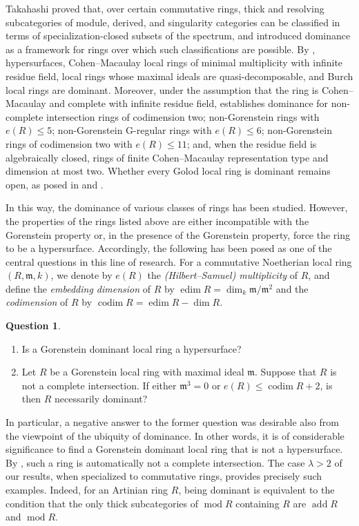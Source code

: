 \documentclass{amsart}
\theoremstyle{definition}
\newtheorem{ques}[thm]{Question}
\theoremstyle{remark}
\numberwithin{equation}{thm}
\def\add{\operatorname{add}}
\def\codim{\operatorname{codim}}
\def\dim{\operatorname{dim}}
\def\edim{\operatorname{edim}}
\def\le{\leqslant}
\def\m{\mathfrak{m}}
\def\mod{\operatorname{mod}}
\begin{document}
Takahashi proved that, over certain commutative rings, thick and resolving subcategories of module, derived, and singularity categories can be classified in terms of specialization-closed subsets of the spectrum, and introduced dominance as a framework for rings over which such classifications are possible.
By \cite[Proposition 5.10]{T23}, hypersurfaces, Cohen--Macaulay local rings of minimal multiplicity with infinite residue field, local rings whose maximal ideals are quasi-decomposable, and Burch local rings are dominant.
Moreover, under the assumption that the ring is Cohen--Macaulay and complete with infinite residue field, \cite[Theorem 1.2]{KT} establishes dominance for non-complete intersection rings of codimension two; non-Gorenstein rings with $e(R)\le 5$; non-Gorenstein G-regular rings with $e(R)\le 6$; non-Gorenstein rings of codimension two with $e(R)\le 11$; and, when the residue field is algebraically closed, rings of finite Cohen--Macaulay representation type and dimension at most two.
Whether every Golod local ring is dominant remains open, as posed in \cite[Question 9.4]{T23} and \cite[Question 1.1(3)]{KT}.

In this way, the dominance of various classes of rings has been studied.
However, the properties of the rings listed above are either incompatible with the Gorenstein property or, in the presence of the Gorenstein property, force the ring to be a hypersurface. 
Accordingly, the following has been posed as one of the central questions in this line of research.
For a commutative Noetherian local ring $(R,\m,k)$, we denote by $e(R)$ the \textit{(Hilbert--Samuel) multiplicity} of $R$, and define the \textit{embedding dimension} of $R$ by $\edim R=\dim_k \m/\m^2$ and the \textit{codimension} of $R$ by $\codim R=\edim R-\dim R$.

\begin{ques}\label{ques dom Gor}
\begin{enumerate}[\rm (1)]
\item \cite[Question 9.6]{T23} Is a Gorenstein dominant local ring a hypersurface?
\item \cite[Question 7.1]{KT} Let $R$ be a Gorenstein local ring with maximal ideal $\m$. Suppose that $R$ is not a complete intersection. If either $\m^3=0$ or $e(R)\le \codim R+2$, is then $R$ necessarily dominant?
\end{enumerate}
\end{ques}

In particular, a negative answer to the former question was desirable also from the viewpoint of the ubiquity of dominance. In other words, it is of considerable significance to find a Gorenstein dominant local ring that is not a hypersurface. By \cite[Proposition 6.2(3)]{T23}, such a ring is automatically not a complete intersection. The case $\lambda>2$ of our results, when specialized to commutative rings, provides precisely such examples. Indeed, for an Artinian ring $R$, being dominant is equivalent to the condition that the only thick subcategories of $\mod R$ containing $R$ are $\add R$ and $\mod R$.
\end{document}
